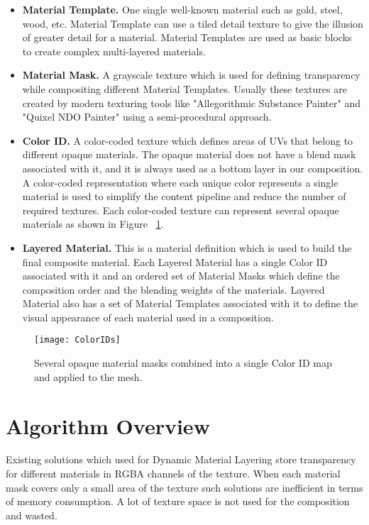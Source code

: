 \begin{itemize}  
\item \textbf{Material Template.}
One single well-known material such as gold, steel, wood, etc.
Material Template can use a tiled detail texture to give the illusion of greater detail for a material.
Material Templates are used as basic blocks to create complex multi-layered materials.
\item \textbf{Material Mask.}
A grayscale texture which is used for defining transparency while compositing different Material Templates. 
Usually these textures are created by modern texturing tools like "Allegorithmic Substance Painter" and "Quixel NDO Painter" using a semi-procedural approach.
\item \textbf{Color ID.}
A color-coded texture which defines areas of UVs that belong to different opaque materials.
The opaque material does not have a blend mask associated with it, and it is always used as a bottom layer in our composition.
A color-coded representation where each unique color represents a single material is used to simplify the content pipeline and reduce the number of required textures.
Each color-coded texture can represent several opaque materials as shown in Figure ~\ref{Makeev-ColorIds}.
\item \textbf{Layered Material.}
This is a material definition which is used to build the final composite material.
Each Layered Material has a single Color ID associated with it and an ordered set of Material Masks which define the composition order and the blending weights of the materials.
Layered Material also has a set of Material Templates associated with it to define the visual appearance of each material used in a composition.
\end{itemize}

\begin{figure}\centering
\texttt{[image: ColorIDs]}
\caption{Several opaque material masks combined into a single Color ID map and applied to the mesh.}
\label{Makeev-ColorIds}
\end{figure}

\section{Algorithm Overview}

Existing solutions \cite{LayeredMaterialUE4,LayeredMaterialSubstance} which used for Dynamic Material Layering store transparency for different materials in RGBA channels of the texture.
When each material mask covers only a small area of the texture such solutions are inefficient in terms of memory consumption.
A lot of texture space is not used for the composition and wasted.


